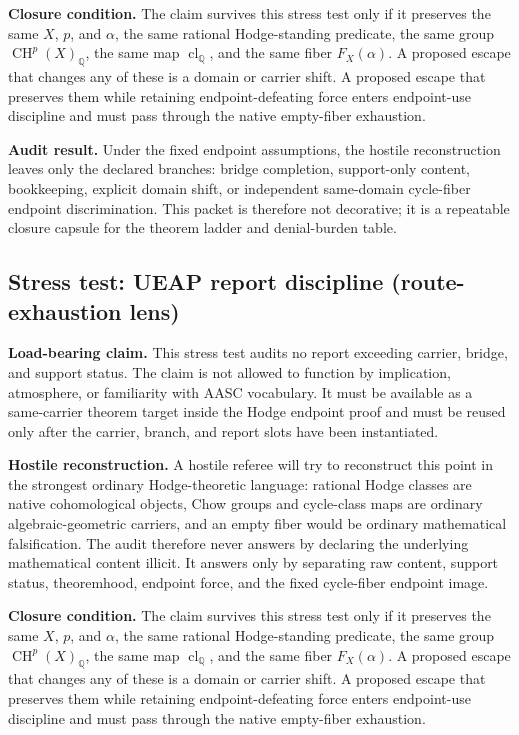 \documentclass[11pt]{article}
\newcommand{\QQ}{\mathbb{Q}}
\newcommand{\CH}{\operatorname{CH}}
\newcommand{\clQ}{\operatorname{cl}_{\QQ}}
\begin{document}
\par\noindent\textbf{Closure condition.} The claim survives this stress test only if it preserves the same $X$, $p$, and $\alpha$, the same rational Hodge-standing predicate, the same group $\CH^p(X)_\QQ$, the same map $\clQ$, and the same fiber $F_X(\alpha)$. A proposed escape that changes any of these is a domain or carrier shift. A proposed escape that preserves them while retaining endpoint-defeating force enters endpoint-use discipline and must pass through the native empty-fiber exhaustion.

\par\noindent\textbf{Audit result.} Under the fixed endpoint assumptions, the hostile reconstruction leaves only the declared branches: bridge completion, support-only content, bookkeeping, explicit domain shift, or independent same-domain cycle-fiber endpoint discrimination. This packet is therefore not decorative; it is a repeatable closure capsule for the theorem ladder and denial-burden table.


\subsection{Stress test: UEAP report discipline (route-exhaustion lens)}

\par\noindent\textbf{Load-bearing claim.} This stress test audits no report exceeding carrier, bridge, and support status. The claim is not allowed to function by implication, atmosphere, or familiarity with AASC vocabulary. It must be available as a same-carrier theorem target inside the Hodge endpoint proof and must be reused only after the carrier, branch, and report slots have been instantiated.

\par\noindent\textbf{Hostile reconstruction.} A hostile referee will try to reconstruct this point in the strongest ordinary Hodge-theoretic language: rational Hodge classes are native cohomological objects, Chow groups and cycle-class maps are ordinary algebraic-geometric carriers, and an empty fiber would be ordinary mathematical falsification. The audit therefore never answers by declaring the underlying mathematical content illicit. It answers only by separating raw content, support status, theoremhood, endpoint force, and the fixed cycle-fiber endpoint image.

\par\noindent\textbf{Closure condition.} The claim survives this stress test only if it preserves the same $X$, $p$, and $\alpha$, the same rational Hodge-standing predicate, the same group $\CH^p(X)_\QQ$, the same map $\clQ$, and the same fiber $F_X(\alpha)$. A proposed escape that changes any of these is a domain or carrier shift. A proposed escape that preserves them while retaining endpoint-defeating force enters endpoint-use discipline and must pass through the native empty-fiber exhaustion.
\end{document}
